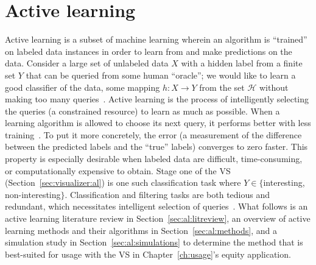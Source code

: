 \chapter{Active learning \label{ch:al}}

Active learning is a subset of machine learning wherein an algorithm is 
``trained'' on labeled data instances in order to learn from and make 
predictions on the data.  Consider a large set of unlabeled data $X$ with a 
hidden label from a finite set $Y$ that can be queried from some human 
``oracle''; we would like to learn a good classifier of the data, some mapping 
$h: X \rightarrow Y$ from the set $\mathcal{H}$ without making too many 
queries~\cite{dasgupta2011}. Active learning is the process of intelligently 
selecting the queries (a constrained resource) to learn as much as possible. 
When a learning algorithm is allowed to choose its next query, it performs 
better with less training~\cite{settles2010}. To put it more concretely, the 
error (a measurement of the difference between the predicted labels and the 
``true'' labels) converges to zero faster. This property is especially 
desirable when labeled data are difficult, time-consuming, or computationally 
expensive to obtain. Stage one of the VS (Section~\ref{sec:visualizer:al}) is 
one such classification task where $Y\in\{$interesting, non-interesting$\}$. 
Classification and filtering tasks are both tedious and redundant, which 
necessitates intelligent selection of queries~\cite{settles2010}. What follows 
is an active learning literature review in Section~\ref{sec:al:litreview}, an 
overview of active learning methods and their algorithms in 
Section~\ref{sec:al:methods}, and a simulation study in 
Section~\ref{sec:al:simulations} to determine the method that is best-suited 
for usage with the VS in Chapter~\ref{ch:usage}'s equity application.





%
%
